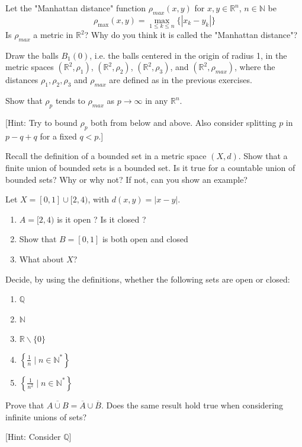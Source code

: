 \documentclass[11pt]{article}%
\newcommand{\R}{\mathbb{R}}
\newcommand{\Q}{\mathbb{Q}}
\newcommand{\N}{\mathbb{N}}
\newcommand{\bigst}{\;\Bigg|\;}
\begin{document}
\begin{Exercise}[title=*$\dagger$ - The Manhattan distance]
	Let the "Manhattan distance" function $\rho_{max}(x,y)$ for $x,y\in\mathbb R^n$, $n\in\mathbb N$ be $$\rho_{\max}(x,y)=\max\limits_{1\leq k\leq n}\{|x_k-y_k|\}$$ Is $\rho_{max}$ a metric in $\mathbb R^2$? Why do you think it is called the "Manhattan distance"?
\end{Exercise}

\begin{Exercise}[title=*]
	Draw the balls $B_1(0)$, i.e. the balls centered in the origin of radius 1, in the metric spaces $(\mathbb R^2,\rho_1)$, $(\mathbb R^2,\rho_2)$, $(\mathbb R^2,\rho_3)$, and $(\mathbb R^2,\rho_{max})$, where the distances $\rho_1, \rho_2,\rho_3$ and $\rho_{max}$ are defined as in the previous exercises.
\end{Exercise}

\begin{Exercise}[title=***]
	Show that $\rho_p$ tends to $\rho_{max}$ as $p\to\infty$ in any $\mathbb R^n$.
	
	[Hint: Try to bound $\rho_p$ both from below and above. Also consider splitting $p$ in $p-q+q$ for a fixed $q<p$.]
\end{Exercise}

\begin{Exercise}[title=*]
	Recall the definition of a bounded set in a metric space $(X,d)$. Show that a finite union of bounded sets is a bounded set. Is it true for a countable union of bounded sets? Why or why not? If not, can you show an example?
\end{Exercise}

\begin{Exercise}[title=*$\dagger$]
	 Let $X=[0,1]\cup[2,4)$, with $d(x,y)=|x-y|$.
	\begin{enumerate}
		\item $A=[2,4)$ is it open ? Is it closed ?
		\item Show that $B=[0,1]$ is both open and closed
		\item What about $X$?
	\end{enumerate}
\end{Exercise}

\begin{Exercise}[title=*$\dagger$]
	Decide, by using the definitions, whether the following sets are open or closed:
	\begin{enumerate}
		\item $\Q$
		\item $\N$
		\item $\R \backslash \{0\}$
		\item $\left\{\frac{1}{n}\bigst n\in\N^\ast\right\}$
		\item $\left\{\frac{1}{n^2}\bigst n\in\N^\ast\right\}$
	\end{enumerate}
\end{Exercise}


\begin{Exercise}[title=**]
	Prove that $\overline{A\cup B} = \overline A \cup \overline B$. Does the same result hold true when considering infinite unions of sets?
	
	
	[Hint: Consider $\Q$]
	
\end{Exercise}
\end{document}
